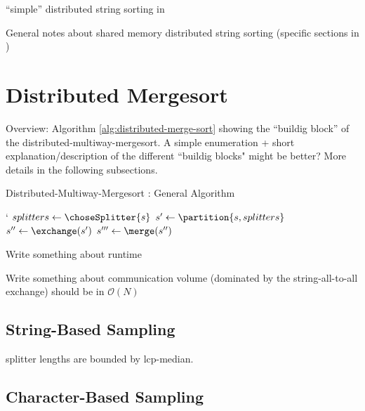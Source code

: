 \documentclass[12pt,a4paper,twoside]{scrartcl}
\numberwithin{equation}{section}
\begin{document}
``simple'' distributed string sorting in \cite{fischer2019lightweight}

General notes about shared memory distributed string sorting (specific sections in \cite{bingmann2018scalable})



\section{Distributed Mergesort}


Overview: Algorithm \ref{alg:distributed-merge-sort} showing the ``buildig block'' of the distributed-multiway-mergesort. A simple enumeration + short explanation/description of the different ``buildig blocks" might be better? More details in the following subsections.

\begin{algorithm}
	\caption{Distributed-Multiway-Mergesort : General Algorithm}\label{alg:distributed-merge-sort}
	`
	\BlankLine
	 
	$splitters \leftarrow \choseSplitter{s}$ 
	$s' \leftarrow \partition{s, splitters}$ 
	$s'' \leftarrow \exchange(s')$ \; 
	$s''' \leftarrow \merge(s'')$
	
	
\end{algorithm}

Write something about runtime 

Write something about communication volume (dominated by the string-all-to-all exchange) should be in $\mathcal{O}(N)$


\subsection{String-Based Sampling}

splitter lengths are bounded by lcp-median.

\subsection{Character-Based Sampling}
\end{document}
